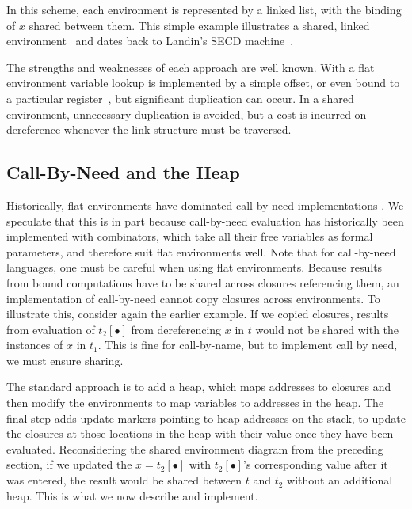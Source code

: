 \documentclass[preprint]{sigplanconf}
\begin{document}
\begin{center}
\end{center}
In this scheme, each environment is represented by a linked list, with
the binding of $x$ shared between them. This simple example
illustrates a shared, linked environment~\cite{appel1988optimizing}
and dates back to Landin's SECD machine~\cite{landin1964mechanical}.

The strengths and weaknesses of each approach are well known.  With a flat
environment variable lookup is implemented by a simple offset, or even
bound to a particular register~\cite{jonesstg, appel2006compiling},
but significant duplication can occur.  In a shared environment, unnecessary
duplication is avoided, but a cost is incurred on dereference whenever the
link structure must be traversed.

\subsection{Call-By-Need and the Heap}

Historically, flat environments have dominated call-by-need implementations
\cite{jonesstg, TIM, johnsson1984efficient,
boquist1997grin}. We speculate that this is in part because call-by-need
evaluation has historically been implemented with combinators, which take all
their free variables as formal parameters, and therefore suit flat environments
well. Note that for call-by-need languages, one must be careful when using flat
environments.  Because results from bound computations have to be shared across
closures referencing them, an implementation of call-by-need cannot copy
closures across environments. To illustrate this, consider again the earlier
example.  If we copied closures, results from evaluation of $t_2[\bullet]$ from
dereferencing $x$ in $t$ would not be shared with the instances of $x$ in
$t_1$.  This is fine for call-by-name, but to implement call by need, we must
ensure sharing.

The standard approach is to add a heap, which maps addresses to closures
\cite{jonesstg, TIM, johnsson1984efficient, sestoft} and then
modify the environments to map variables to addresses in the heap. The final
step adds update markers pointing to heap addresses on the stack, to update
the closures at those locations in the heap with their value once they have been
evaluated.  Reconsidering the shared environment diagram from the preceding
section, if we updated the $x=t_2[\bullet]$ with $t_2[\bullet]$'s corresponding
value after it was entered, the result would be shared between $t$ and $t_2$
without an additional heap. This is what we now describe and implement.
\end{document}
